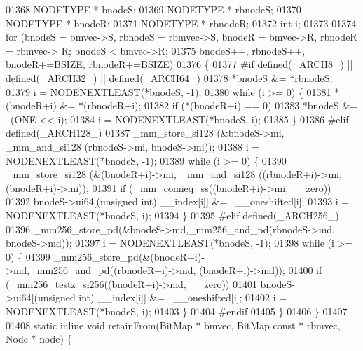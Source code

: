 \begin{DoxyCode}
{01368         NODETYPE * bnodeS;
01369         NODETYPE * rbnodeS;
01370         NODETYPE * bnodeR;
01371         NODETYPE * rbnodeR;
01372         \textcolor{keywordtype}{int} i;
01373 
01374         \textcolor{keywordflow}{for} (bnodeS = bmvec->S, rbnodeS = rbmvec->S, bnodeR = bmvec->R, rbnodeR = rbmvec->
      R; bnodeS < bmvec->R;
01375                         bnodeS++, rbnodeS++, bnodeR+=BSIZE, rbnodeR+=BSIZE)
01376         \{
01377 \textcolor{preprocessor}{#if defined(\_ARCH8\_) || defined(\_ARCH32\_) || defined(\_ARCH64\_)}
01378                 *bnodeS &= *rbnodeS;
01379                 i = NODENEXTLEAST(*bnodeS, -1);
01380                 \textcolor{keywordflow}{while} (i >= 0) \{
01381                         *(bnodeR+i) &= *(rbnodeR+i);
01382                         \textcolor{keywordflow}{if} (*(bnodeR+i) == 0)
01383                                 *bnodeS &= ~(ONE << i);
01384                         i = NODENEXTLEAST(*bnodeS, i);
01385                 \}
01386 \textcolor{preprocessor}{#elif defined(\_ARCH128\_)}
01387                 \_mm\_store\_si128 (&bnodeS->mi, \_mm\_and\_si128 (rbnodeS->mi, bnodeS->mi));
01388                 i = NODENEXTLEAST(*bnodeS, -1);
01389                 \textcolor{keywordflow}{while} (i >= 0) \{
01390                         \_mm\_store\_si128 (&(bnodeR+i)->mi, \_mm\_and\_si128 ((rbnodeR+i)->mi, (bnodeR+i)->mi));
01391                         \textcolor{keywordflow}{if} (\_mm\_comieq\_ss((bnodeR+i)->mi, \_\_zero))
01392                                 bnodeS->ui64[(\textcolor{keywordtype}{unsigned} int) \_\_index[i]] &= ~\_\_oneshifted[i];
01393                         i = NODENEXTLEAST(*bnodeS, i);
01394                 \}
01395 \textcolor{preprocessor}{#elif defined(\_ARCH256\_)}
01396                 \_mm256\_store\_pd(&bnodeS->md,\_mm256\_and\_pd(rbnodeS->md, bnodeS->md));
01397                 i = NODENEXTLEAST(*bnodeS, -1);
01398                 \textcolor{keywordflow}{while} (i >= 0) \{
01399                         \_mm256\_store\_pd(&(bnodeR+i)->md,\_mm256\_and\_pd((rbnodeR+i)->md, (bnodeR+i)->md));
01400                         \textcolor{keywordflow}{if} (\_mm256\_testz\_si256((bnodeR+i)->md, \_\_zero))
01401                                 bnodeS->ui64[(\textcolor{keywordtype}{unsigned} int) \_\_index[i]] &= ~\_\_oneshifted[i];
01402                         i = NODENEXTLEAST(*bnodeS, i);
01403                 \}
01404 \textcolor{preprocessor}{#endif}
01405         \}
01406 \}
01407 
01408 \textcolor{keyword}{static} \textcolor{keyword}{inline} \textcolor{keywordtype}{void} retainFrom(BitMap * bmvec, BitMap \textcolor{keyword}{const} * rbmvec, Node * node) \{
}
\end{DoxyCode}
